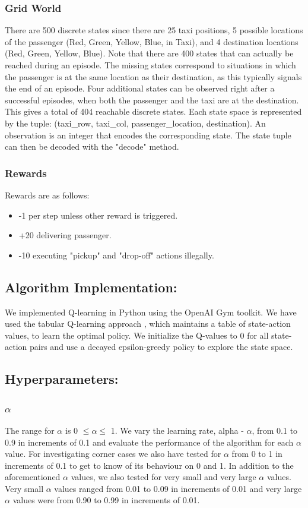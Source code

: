 \documentclass[conference]{IEEEtran}
\begin{document}
\subsubsection{Grid World}
There are 500 discrete states since there are 25 taxi positions, 5 possible locations of the passenger (Red, Green, Yellow, Blue, in Taxi), and 4 destination locations (Red, Green, Yellow, Blue). Note that there are 400 states that can actually be reached during an episode. The missing states correspond to situations in which the passenger is at the same location as their destination, as this typically signals the end of an episode. Four additional states can be observed right after a successful episodes, when both the passenger and the taxi are at the destination. This gives a total of 404 reachable discrete states. Each state space is represented by the tuple: (taxi\_row, taxi\_col, passenger\_location, destination). An observation is an integer that encodes the corresponding state. The state tuple can then be decoded with the "decode" method.
\newline
\subsubsection{Rewards}
Rewards are as follows:
\begin{itemize}
    \item -1 per step unless other reward is triggered.
    \item +20 delivering passenger.
    \item -10  executing "pickup" and "drop-off" actions illegally.
    \newline
\end{itemize}

\subsection{Algorithm Implementation:}
We implemented Q-learning in Python using the OpenAI Gym toolkit. We have used the tabular Q-learning approach \cite{4}, which maintains a table of state-action values, to learn the optimal policy. We initialize the Q-values to 0 for all state-action pairs and use a decayed epsilon-greedy policy to explore the state space. 

\subsection{Hyperparameters:}
\subsubsection{$\alpha$}
The range for $\alpha$ is 0 $\leq \alpha \leq$ 1. We vary the learning rate, alpha - $\alpha$, from 0.1 to 0.9 in increments of 0.1 and evaluate the performance of the algorithm for each $\alpha$ value. For investigating corner cases we also have tested for $\alpha$ from 0 to 1 in increments of 0.1 to get to know of its behaviour on 0 and 1. In addition to the aforementioned $\alpha$ values, we also tested for very small and very large $\alpha$ values. Very small $\alpha$ values ranged from 0.01 to 0.09 in increments of 0.01 and very large $\alpha$ values were from 0.90 to 0.99 in increments of 0.01. 
\newline
\end{document}
